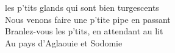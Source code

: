
 les p'tits glands qui sont bien turgescents
\\Nous venons faire une p'tite pipe en passant
\\Branlez-vous les p'tits, en attendant au lit
\\Au pays d'Aglaouie et Sodomie \bissimple

\blackline